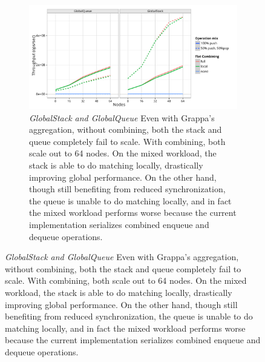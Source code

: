 \begin{figure}[t]
  \centering
  \begin{subfigure}[b]{0.9\textwidth}
  \centering
  \includegraphics[width=\textwidth]{data/plots/vector_perf.pdf}
  \caption{\emph{GlobalStack and GlobalQueue} Even with Grappa's aggregation, without combining, both the stack and queue completely fail to scale. With combining, both scale out to 64 nodes. On the mixed workload, the stack is able to do matching locally, drastically improving global performance.
  On the other hand, though still benefiting from reduced synchronization, the queue is unable to do matching locally, and in fact the mixed workload performs worse because the current implementation serializes combined enqueue and dequeue operations.
  }
  \label{fig:vector}
  \end{subfigure}%
  

\end{figure}
